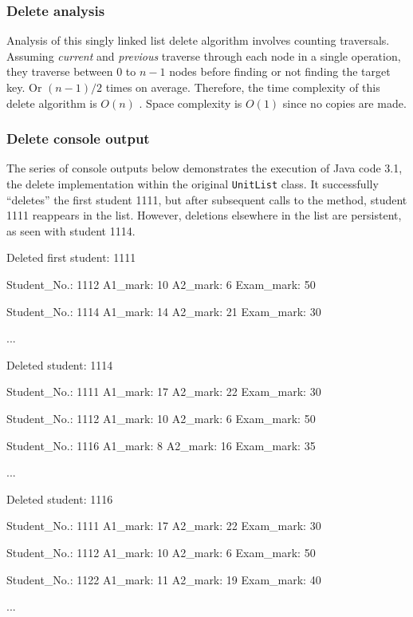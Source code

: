 \subsubsection{Delete analysis}

Analysis of this singly linked list delete algorithm involves counting traversals. Assuming \emph{current} and \emph{previous} traverse through each node in a single operation, they traverse between 0 to $n - 1$ nodes before finding or not finding the target key. Or $(n - 1) / 2$ times on average. Therefore, the time complexity of this delete algorithm is $O(n)$ \citep[p. 83]{Watt2001}. Space complexity is $O(1)$ since no copies are made.

\subsubsection{Delete console output}

The series of console outputs below demonstrates the execution of Java code 3.1, the delete implementation within the original \texttt{UnitList} class. It successfully ``deletes'' the first student 1111, but after subsequent calls to the method, student 1111 reappears in the list. However, deletions elsewhere in the list are persistent, as seen with student 1114.
\\
\begin{consolecode}
Deleted first student: 1111

Student_No.: 1112
A1_mark: 10
A2_mark: 6
Exam_mark: 50

Student_No.: 1114
A1_mark: 14
A2_mark: 21
Exam_mark: 30

...
\end{consolecode}

\begin{consolecode}
Deleted student: 1114

Student_No.: 1111
A1_mark: 17
A2_mark: 22
Exam_mark: 30

Student_No.: 1112
A1_mark: 10
A2_mark: 6
Exam_mark: 50

Student_No.: 1116
A1_mark: 8
A2_mark: 16
Exam_mark: 35

...
\end{consolecode}

\begin{consolecode}
Deleted student: 1116

Student_No.: 1111
A1_mark: 17
A2_mark: 22
Exam_mark: 30

Student_No.: 1112
A1_mark: 10
A2_mark: 6
Exam_mark: 50

Student_No.: 1122
A1_mark: 11
A2_mark: 19
Exam_mark: 40

...
\end{consolecode}

